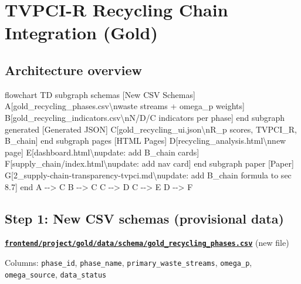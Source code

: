 \documentclass[
  11pt,
]{article}
\author{}
\date{}
\newenvironment{Shaded}{}{}
\newcommand{\NormalTok}[1]{#1}
\begin{document}
\section{TVPCI-R Recycling Chain Integration
(Gold)}\label{tvpci-r-recycling-chain-integration-gold}

\subsection{Architecture overview}\label{architecture-overview}

\begin{Shaded}
\begin{Highlighting}[]
\NormalTok{flowchart TD}
\NormalTok{    subgraph schemas [New CSV Schemas]}
\NormalTok{        A[gold\_recycling\_phases.csv\textbackslash{}nwaste streams + omega\_p weights]}
\NormalTok{        B[gold\_recycling\_indicators.csv\textbackslash{}nN/D/C indicators per phase]}
\NormalTok{    end}
\NormalTok{    subgraph generated [Generated JSON]}
\NormalTok{        C[gold\_recycling\_ui.json\textbackslash{}nR\_p scores, TVPCI\_R, B\_chain]}
\NormalTok{    end}
\NormalTok{    subgraph pages [HTML Pages]}
\NormalTok{        D[recycling\_analysis.html\textbackslash{}nnew page]}
\NormalTok{        E[dashboard.html\textbackslash{}nupdate: add B\_chain cards]}
\NormalTok{        F[supply\_chain/index.html\textbackslash{}nupdate: add nav card]}
\NormalTok{    end}
\NormalTok{    subgraph paper [Paper]}
\NormalTok{        G[2\_supply{-}chain{-}transparency{-}tvpci.md\textbackslash{}nupdate: add B\_chain formula to sec 8.7]}
\NormalTok{    end}
\NormalTok{    A {-}{-}\textgreater{} C}
\NormalTok{    B {-}{-}\textgreater{} C}
\NormalTok{    C {-}{-}\textgreater{} D}
\NormalTok{    C {-}{-}\textgreater{} E}
\NormalTok{    D {-}{-}\textgreater{} F}
\end{Highlighting}
\end{Shaded}

\subsection{Step 1: New CSV schemas (provisional
data)}\label{step-1-new-csv-schemas-provisional-data}

\textbf{\href{frontend/project/gold/data/schema/gold_recycling_phases.csv}{\texttt{frontend/project/gold/data/schema/gold\_recycling\_phases.csv}}}
(new file)

Columns: \texttt{phase\_id}, \texttt{phase\_name},
\texttt{primary\_waste\_streams}, \texttt{omega\_p},
\texttt{omega\_source}, \texttt{data\_status}
\end{document}
